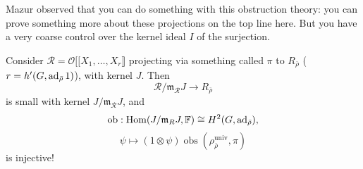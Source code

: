 \documentclass[reqno]{amsart} 
\numberwithin{theorem}{section}
\numberwithin{equation}{section}
\numberwithin{exercise}{section}
\begin{document}
Mazur observed that you can do something with this obstruction theory: you can prove something more about these projections on the top line here.  But you have a very coarse control over the kernel ideal $I$ of the surjection.
\begin{theorem}\label{theorem:cq6thpd9ja}
  Consider $\mathcal{R}  = \mathcal{O} [[  X_1, \dotsc, X_r \rrbracket$ projecting via something called $\pi$ to $R_{\bar{\rho}}$ ($r = h'(G, \operatorname{ad}_{\bar{\rho}} 1)$), with kernel $J$.  Then
  \begin{equation*}
    \mathcal{R} / \mathfrak{m}_{\mathcal{R}} J \rightarrow R_{\bar{\rho}}
  \end{equation*}
  is small with kernel $J / \mathfrak{m}_{\mathcal{R}} J$, and
  \begin{equation*}
    \mathrm{o b} : \operatorname{Hom}(J / \mathfrak{m}_R J, \mathbb{F}) \cong H^2(G, \operatorname{ad}_{\bar{\rho}}),
  \end{equation*}
  \begin{equation*}
    \psi \mapsto(1 \otimes \psi) \operatorname{o b s} \left( \rho_{\bar{\rho}}^{\mathrm{univ}}, \pi \right)
  \end{equation*}
  is injective!
\end{theorem}
\end{document}
